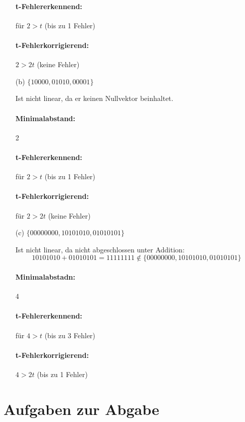 \documentclass{article} %
\begin{document}
\begin{itemize}
\begin{mybox}
  \paragraph{t-Fehlererkennend:} für $2 > t$ (bis zu 1 Fehler) 
  \paragraph{t-Fehlerkorrigierend:} $2 > 2t$ (keine Fehler)
  \end{mybox}
  \item[(b)] \( \{10000, 01010, 00001\} \)
\begin{mybox}
Ist nicht linear, da er keinen Nullvektor beinhaltet. 
\paragraph{Minimalabstand:} 2
\paragraph{t-Fehlererkennend:} für $2 > t$ (bis zu 1 Fehler) 
\paragraph{t-Fehlerkorrigierend:} für $2 > 2t$ (keine Fehler) 
\end{mybox}
  \item[(c)] \( \{00000000, 10101010, 01010101\} \)
  \begin{mybox}
  Ist nicht linear, da nicht abgeschlossen unter Addition: 
  \[10101010 + 01010101 = 11111111 \notin \{00000000, 10101010, 01010101\} \]
  \paragraph{Minimalabstadn:} 4
  \paragraph{t-Fehlererkennend:} für $4 > t$ (bis zu 3 Fehler) 
  \paragraph{t-Fehlerkorrigierend:} $4 > 2t$ (bis zu 1 Fehler) 
  \end{mybox}
\end{itemize}



\section*{Aufgaben zur Abgabe}
\end{document}
